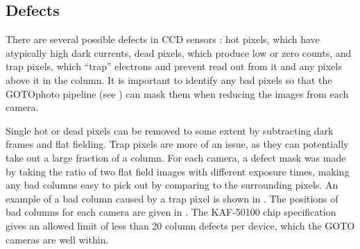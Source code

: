 \subsection{Defects}
\label{sec:defects}
\begin{colsection}

There are several possible defects in CCD sensors \citep{CCDs}: hot pixels, which have atypically high dark currents, dead pixels, which produce low or zero counts, and trap pixels, which ``trap'' electrons and prevent read out from it and any pixels above it in the column. It is important to identify any bad pixels so that the GOTOphoto pipeline (see ) can mask them when reducing the images from each camera.

Single hot or dead pixels can be removed to some extent by subtracting dark frames and flat fielding. Trap pixels are more of an issue, as they can potentially take out a large fraction of a column. For each camera, a defect mask was made by taking the ratio of two flat field images with different exposure times, making any bad columns easy to pick out by comparing to the surrounding pixels. An example of a bad column caused by a trap pixel is shown in . The positions of bad columns for each camera are given in . The KAF-50100 chip specification gives an allowed limit of less than 20 column defects per device, which the GOTO cameras are well within.


\end{colsection}
